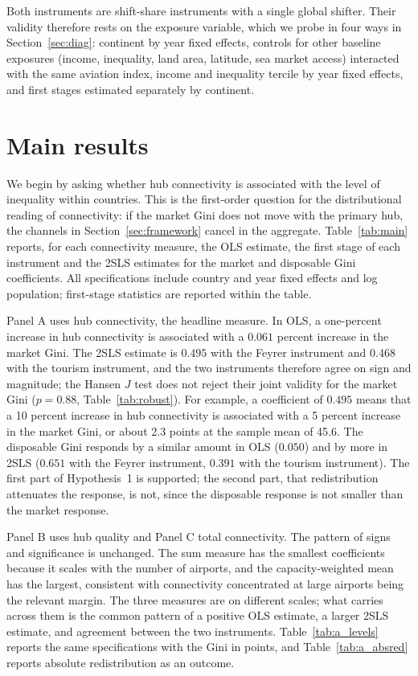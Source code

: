 \documentclass[12pt]{article}
\begin{document}
Both instruments are shift-share instruments with a single global shifter. Their validity therefore rests on the exposure variable, which we probe in four ways in Section~\ref{sec:diag}: continent by year fixed effects, controls for other baseline exposures (income, inequality, land area, latitude, sea market access) interacted with the same aviation index, income and inequality tercile by year fixed effects, and first stages estimated separately by continent.

\section{Main results}
\label{sec:results}
We begin by asking whether hub connectivity is associated with the level of inequality within countries. This is the first-order question for the distributional reading of connectivity: if the market Gini does not move with the primary hub, the channels in Section~\ref{sec:framework} cancel in the aggregate. Table~\ref{tab:main} reports, for each connectivity measure, the OLS estimate, the first stage of each instrument and the 2SLS estimates for the market and disposable Gini coefficients. All specifications include country and year fixed effects and log population; first-stage statistics are reported within the table.

Panel A uses hub connectivity, the headline measure. In OLS, a one-percent increase in hub connectivity is associated with a $0.061$ percent increase in the market Gini. The 2SLS estimate is $0.495$ with the Feyrer instrument and $0.468$ with the tourism instrument, and the two instruments therefore agree on sign and magnitude; the Hansen $J$ test does not reject their joint validity for the market Gini ($p=0.88$, Table~\ref{tab:robust}). For example, a coefficient of $0.495$ means that a 10 percent increase in hub connectivity is associated with a 5 percent increase in the market Gini, or about 2.3 points at the sample mean of 45.6. The disposable Gini responds by a similar amount in OLS ($0.050$) and by more in 2SLS ($0.651$ with the Feyrer instrument, $0.391$ with the tourism instrument). The first part of Hypothesis~1 is supported; the second part, that redistribution attenuates the response, is not, since the disposable response is not smaller than the market response.

Panel B uses hub quality and Panel C total connectivity. The pattern of signs and significance is unchanged. The sum measure has the smallest coefficients because it scales with the number of airports, and the capacity-weighted mean has the largest, consistent with connectivity concentrated at large airports being the relevant margin. The three measures are on different scales; what carries across them is the common pattern of a positive OLS estimate, a larger 2SLS estimate, and agreement between the two instruments. Table~\ref{tab:a_levels} reports the same specifications with the Gini in points, and Table~\ref{tab:a_absred} reports absolute redistribution as an outcome.
\end{document}
